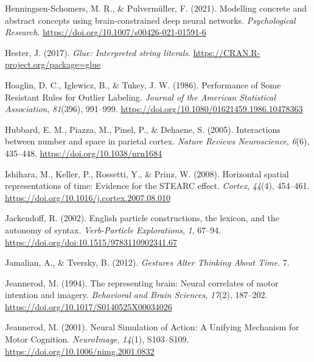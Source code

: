 \documentclass[
  a4paper,12pt,twoside,onecolumn,openright,final,oldfontcommands]{memoir}
\newlength{\cslhangindent}
\newlength{\cslentryspacingunit} %
\newenvironment{CSLReferences}[2] %
 {%
  \setlength{\parindent}{0pt}
  \ifodd #1
  \let\oldpar\par
  \def\par{\hangindent=\cslhangindent\oldpar}
  \fi
  \setlength{\parskip}{#2\cslentryspacingunit}
 }%
 {}
\begin{document}
\begin{CSLReferences}{1}{0}
\leavevmode{}%
Henningsen-Schomers, M. R., \& Pulvermüller, F. (2021). Modelling concrete and abstract concepts using brain-constrained deep neural networks. \emph{Psychological Research}. \url{https://doi.org/10.1007/s00426-021-01591-6}

\leavevmode{}%
Hester, J. (2017). \emph{Glue: Interpreted string literals}. \url{https://CRAN.R-project.org/package=glue}

\leavevmode{}%
Hoaglin, D. C., Iglewicz, B., \& Tukey, J. W. (1986). Performance of {Some} {Resistant} {Rules} for {Outlier} {Labeling}. \emph{Journal of the American Statistical Association}, \emph{81}(396), 991--999. \url{https://doi.org/10.1080/01621459.1986.10478363}

\leavevmode{}%
Hubbard, E. M., Piazza, M., Pinel, P., \& Dehaene, S. (2005). Interactions between number and space in parietal cortex. \emph{Nature Reviews Neuroscience}, \emph{6}(6), 435--448. \url{https://doi.org/10.1038/nrn1684}

\leavevmode{}%
Ishihara, M., Keller, P., Rossetti, Y., \& Prinz, W. (2008). Horizontal spatial representations of time: {Evidence} for the {STEARC} effect. \emph{Cortex}, \emph{44}(4), 454--461. \url{https://doi.org/10.1016/j.cortex.2007.08.010}

\leavevmode{}%
Jackendoff, R. (2002). English particle constructions, the lexicon, and the autonomy of syntax. \emph{Verb-Particle Explorations}, \emph{1}, 67--94. \url{https://doi.org/doi:10.1515/9783110902341.67}

\leavevmode{}%
Jamalian, A., \& Tversky, B. (2012). \emph{Gestures {Alter} {Thinking} {About} {Time}}. 7.

\leavevmode{}%
Jeannerod, M. (1994). The representing brain: {Neural} correlates of motor intention and imagery. \emph{Behavioral and Brain Sciences}, \emph{17}(2), 187--202. \url{https://doi.org/10.1017/S0140525X00034026}

\leavevmode{}%
Jeannerod, M. (2001). Neural {Simulation} of {Action}: {A} {Unifying} {Mechanism} for {Motor} {Cognition}. \emph{NeuroImage}, \emph{14}(1), S103--S109. \url{https://doi.org/10.1006/nimg.2001.0832}


\end{CSLReferences}
\end{document}
